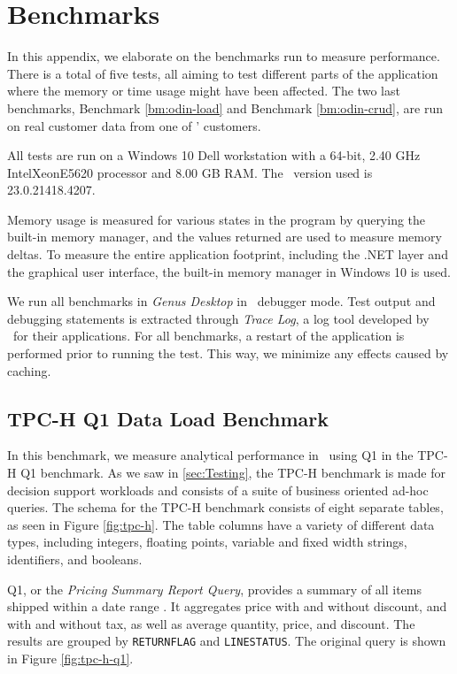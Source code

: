 \chapter{Benchmarks}
\label{app:bm}
In this appendix, we elaborate on the benchmarks run to measure performance. There is a total of five tests, all aiming to test different parts of the application where the memory or time usage might have been affected. The two last benchmarks, Benchmark \ref{bm:odin-load} and Benchmark \ref{bm:odin-crud}, are run on real customer data from one of \genus' customers.

All tests are run on a Windows 10 Dell workstation with a 64-bit, 2.40 GHz Intel\textregistered Xeon\textregistered E5620 processor and 8.00 GB RAM. The \delphi~version used is 23.0.21418.4207. 

Memory usage is measured for various states in the program by querying the built-in  memory manager, and the values returned are used to measure memory deltas. To measure the entire application footprint, including the .NET layer and the graphical user interface, the built-in memory manager in Windows 10 is used.

We run all benchmarks in \textit{Genus Desktop} in \delphi~debugger mode. Test output and debugging statements is extracted through \textit{Trace Log}, a log tool developed by \genus~for their applications. For all benchmarks, a restart of the application is performed prior to running the test. This way, we minimize any effects caused by caching.

\section{TPC-H Q1 Data Load Benchmark}
\label{bm:q1}
In this benchmark, we measure analytical performance in \gap~using Q1 in the TPC-H Q1 benchmark. As we saw in \ref{sec:Testing}, the TPC-H benchmark is made for decision support workloads and consists of a suite of business oriented ad-hoc queries. The schema for the TPC-H benchmark consists of eight separate tables, as seen in Figure \ref{fig:tpc-h}. The table columns have a variety of different data types, including integers, floating points, variable and fixed width strings, identifiers, and booleans. 

Q1, or the \textit{Pricing Summary Report Query}, provides a summary of all items shipped within a date range \cite{Transaction_Processing_Performance_Council_TPC2014-ux}. It aggregates price with and without discount, and with and without tax, as well as average quantity, price, and discount. The results are grouped by \texttt{RETURNFLAG} and \texttt{LINESTATUS}. The original query is shown in Figure \ref{fig:tpc-h-q1}.

